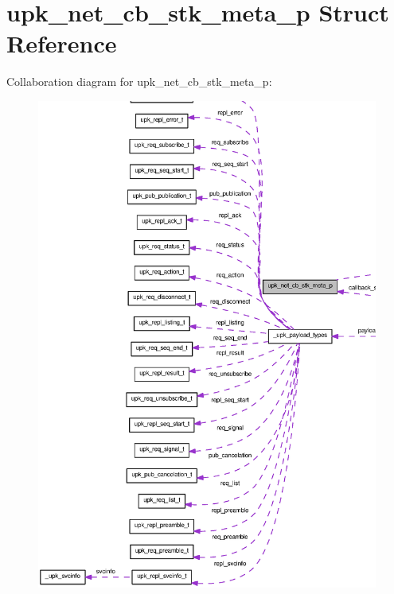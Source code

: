 \section{upk\_\-net\_\-cb\_\-stk\_\-meta\_\-p Struct Reference}
\label{structupk__net__cb__stk__meta__p}


Collaboration diagram for upk\_\-net\_\-cb\_\-stk\_\-meta\_\-p:
\nopagebreak
\begin{figure}[H]
\begin{center}
\leavevmode
\includegraphics[width=400pt]{structupk__net__cb__stk__meta__p__coll__graph}
\end{center}
\end{figure}
